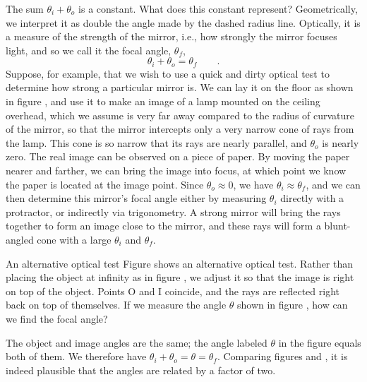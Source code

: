 The sum $\theta_i+\theta_o$ is a constant. What does this
constant represent? Geometrically, we interpret it as double
the angle made by the dashed radius line. Optically, it is a
measure of the strength of the mirror, i.e., how strongly
the mirror focuses light, and so we call it the focal
angle, $\theta_f$,
\begin{equation*}
                \theta_i+\theta_o  =  \theta_f \qquad .
\end{equation*}
Suppose, for example, that we wish to use a quick and dirty
optical test to determine how strong a particular mirror is.
We can lay it on the floor as shown in figure , and use
it to make an image of a lamp mounted on the ceiling
overhead, which we assume is very far away compared to the
radius of curvature of the mirror, so that the mirror
intercepts only a very narrow cone of rays from the lamp.
This cone is so narrow that its rays are nearly parallel,
and $\theta_o$ is nearly zero. The real image can be
observed on a piece of paper. By moving the paper nearer and
farther, we can bring the image into focus, at which point
we know the paper is located at the image point. Since
$\theta_o\approx 0$, we have $\theta_i\approx \theta_f$, and we can
then determine this mirror's focal angle either by measuring
$\theta_i$ directly with a protractor, or indirectly via
trigonometry. A strong mirror will bring the rays together to form
an image close to the mirror, and these rays will form a
blunt-angled cone with a large $\theta_i$ and $\theta_f$.

\begin{eg}{An alternative optical test}\label{eg:focal-angle-alternative}
\egquestion Figure  shows an alternative optical test. Rather
than placing the object at infinity as in figure , we
adjust it so that the image is right on top of the object.
Points O and I coincide, and the rays are reflected right
back on top of themselves. If we measure the angle $\theta $
shown in figure , how can we find the focal angle?

\eganswer The object and image angles are the same; the
angle labeled $\theta $ in the figure equals both of them.
We therefore have $\theta_i+\theta_o=\theta =\theta_f$.
Comparing figures  and , it is indeed plausible that
the angles are related by a factor of two.
\end{eg}

